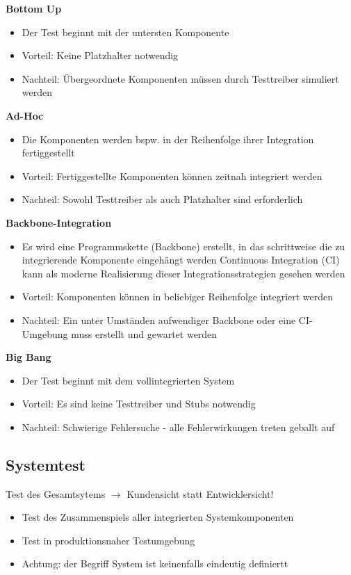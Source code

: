 \documentclass{report}
\theoremstyle{definition}
\theoremstyle{example}
\begin{document}
\textbf{Bottom Up}
\begin{itemize}
   \item Der Test beginnt mit der untersten Komponente
   \item Vorteil: Keine Platzhalter notwendig
   \item Nachteil: Übergeordnete Komponenten müssen durch Testtreiber simuliert werden
\end{itemize}

\textbf{Ad-Hoc}
\begin{itemize}
   \item Die Komponenten werden bspw. in der Reihenfolge ihrer Integration fertiggestellt
   \item Vorteil: Fertiggestellte Komponenten können zeitnah integriert werden
   \item Nachteil: Sowohl Testtreiber als auch Platzhalter sind erforderlich
\end{itemize}

\textbf{Backbone-Integration}
\begin{itemize}
   \item Es wird eine Programmskette (Backbone) erstellt, in das schrittweise die zu integrierende Komponente eingehängt werden
   \subitem Continuous Integration (CI) kann als moderne Realisierung dieser Integrationsstrategien gesehen werden
   \item Vorteil: Komponenten können in beliebiger Reihenfolge integriert werden
   \item Nachteil: Ein unter Umständen aufwendiger Backbone oder eine CI-Umgebung muss erstellt und gewartet werden
\end{itemize}

\textbf{Big Bang}
\begin{itemize}
   \item Der Test beginnt mit dem vollintegrierten System
   \item Vorteil: Es sind keine Testtreiber und Stubs notwendig
   \item Nachteil: Schwierige Fehlersuche - alle Fehlerwirkungen treten geballt auf
\end{itemize}

\subsection{Systemtest}
Test des Gesamtsytems $\rightarrow$ Kundensicht statt Entwicklersicht!

\begin{itemize}
   \item Test des Zusammenspiels aller integrierten Systemkomponenten
   \item Test in produktionsnaher Testumgebung
   \item Achtung: der Begriff System ist keinenfalls eindeutig definiertt
\end{itemize}
\end{document}
